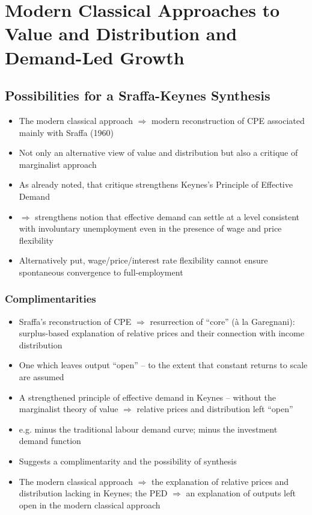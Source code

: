 \documentclass[a4paper,twoside]{article}
\numberwithin{equation}{section}
\numberwithin{figure}{section}
\begin{document}
\section{Modern Classical Approaches to Value and Distribution and Demand-Led Growth}
\subsection{Possibilities for a Sraffa-Keynes Synthesis}
	\begin{itemize}
		\item The modern classical approach \( \Rightarrow \) modern reconstruction of CPE associated mainly with Sraffa (1960)
		\item Not only an alternative view of value and distribution but also a critique of marginalist approach
		\item As already noted, that critique strengthens Keynes's Principle of Effective Demand
		\item \( \Rightarrow \) strengthens notion that effective demand can settle at a level consistent with involuntary unemployment even in the presence of wage and price flexibility
		\item Alternatively put, wage/price/interest rate flexibility cannot ensure spontaneous convergence to full-employment
	\end{itemize}
\subsubsection{Complimentarities}
	\begin{itemize}
		\item Sraffa's reconstruction of CPE \( \Rightarrow \) resurrection of ``core'' (à la Garegnani): surplus-based explanation of relative prices and their connection with income distribution
		\item One which leaves output ``open'' -- to the extent that constant returns to scale are assumed
		\item A strengthened principle of effective demand in Keynes -- without the marginalist theory of value \( \Rightarrow \) relative prices and distribution left ``open''
		\item e.g. minus the traditional labour demand curve; minus the investment demand function
		\item Suggests a complimentarity and the possibility of synthesis
		\item The modern classical approach \( \Rightarrow \) the explanation of relative prices and distribution lacking in Keynes; the PED \( \Rightarrow \) an explanation of outputs left open in the modern classical approach
	\end{itemize}
\end{document}
